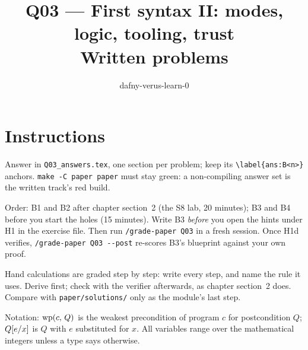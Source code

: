 \documentclass[11pt]{article}
\title{Q03 --- First syntax II: modes, logic, tooling, trust \\ \large Written problems}
\author{dafny-verus-learn-0}
\date{}
\begin{document}
\maketitle

\section*{Instructions}
Answer in \texttt{Q03\_answers.tex}, one section per problem; keep its
\verb+\label{ans:B<n>}+ anchors. \texttt{make -C paper paper} must stay green:
a non-compiling answer set is the written track's red build.

Order: B1 and B2 after chapter section~2 (the S8 lab, 20 minutes); B3 and B4
before you start the holes (15 minutes). Write B3 \emph{before} you open the
hints under H1 in the exercise file. Then run \texttt{/grade-paper Q03} in a
fresh session. Once H1d verifies, \verb+/grade-paper Q03 --post+ re-scores
B3's blueprint against your own proof.

Hand calculations are graded step by step: write every step, and name the rule
it uses. Derive first; check with the verifier afterwards, as chapter section~2
does. Compare with \texttt{paper/solutions/} only as the module's last step.

Notation: $\WP{c}{Q}$ is the weakest precondition of program $c$ for
postcondition $Q$; $\subst{Q}{x}{e}$ is $Q$ with $e$ substituted for $x$.
All variables range over the mathematical integers unless a type says
otherwise.
\end{document}

